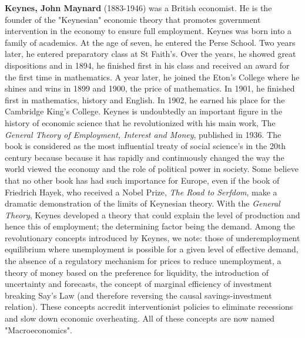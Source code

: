 \textbf{Keynes, John Maynard} (1883-1946) was a British economist. He is the founder of the "Keynesian" economic theory that promotes government intervention in the economy to ensure full employment. Keynes was born into a family of academics. At the age of seven, he entered the Perse School. Two years later, he entered preparatory class at St Faith's. Over the years, he showed great dispositions and in 1894, he finished first in his class and received an award for the first time in mathematics. A year later, he joined the Eton's College where he shines and wins in 1899 and 1900, the price of mathematics. In 1901, he finished first in mathematics, history and English. In 1902, he earned his place for the Cambridge King's College. Keynes is undoubtedly an important figure in the history of economic science that he revolutionized with his main work, The\textit{ General Theory of Employment, Interest and Money}, published in 1936. The book is considered as the most influential treaty of social science's in the 20th century because because it has rapidly and continuously changed the way the world viewed the economy and the role of political power in society. Some believe that no other book has had such importance for Europe, even if the book of Friedrich Hayek, who received a Nobel Prize, \textit{The Road to Serfdom}, make a dramatic demonstration of the limits of Keynesian theory. With the \textit{General Theory}, Keynes developed a theory that could explain the level of production and hence this of employment; the determining factor being the demand. Among the revolutionary concepts introduced by Keynes, we note: those of underemployment equilibrium where unemployment is possible for a given level of effective demand, the absence of a regulatory mechanism for prices to reduce unemployment, a theory of money based on the preference for liquidity, the introduction of uncertainty and forecasts, the concept of marginal efficiency of investment breaking Say's Law (and therefore reversing the causal savings-investment relation). These concepts accredit interventionist policies to eliminate recessions and slow down economic overheating. All of these concepts are now named "Macroeconomics".

